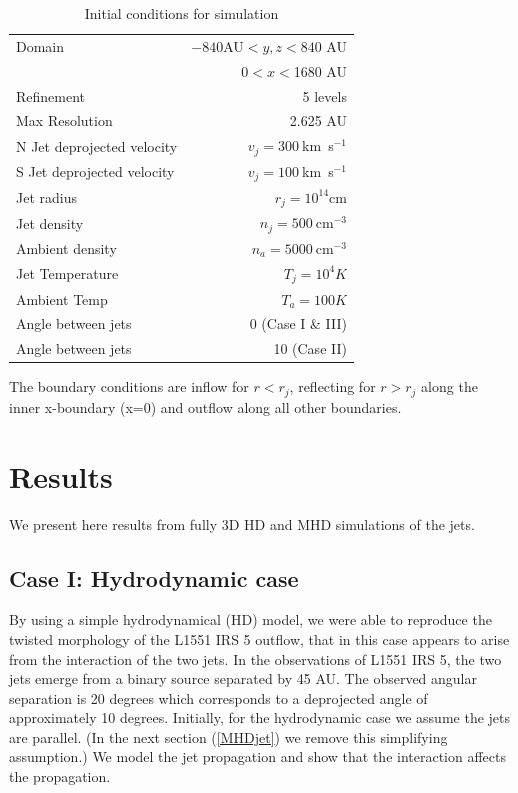 \documentclass{aa}
\begin{document}
\begin{table}
\begin{center}
\begin{tabular}{l r}
\hline
\hline
Domain & $-840 $AU$<y,z<840$ AU \\
 & 0$<x<$1680 AU \\
Refinement & 5 levels \\
{ Max Resolution} & { 2.625 AU} \\
N Jet deprojected velocity & $v_j=300~$km~s$^{-1}$ \\
S Jet deprojected velocity & $v_j=100~$km~s$^{-1}$ \\
{ Jet radius} & $r_j=10^{14}$cm \\
Jet density & $n_j=500~$cm$^{-3}$ \\
Ambient density & $n_a=5000~$cm$^{-3}$ \\
Jet Temperature & $T_j=10^4 K$ \\
Ambient Temp & $T_a=100 K$ \\
{ Angle between jets} & {0 (Case I \& III)} \\
{ Angle between jets} & {10 (Case II)} \\
\hline
\end{tabular}
\caption{Initial conditions for simulation}
\end{center}
\end{table}

The boundary conditions are inflow for $r<r_j$, reflecting for $r>r_j$ along the inner x-boundary (x=0) and outflow along all other boundaries. 
\section{Results}\label{Results}

We present here results from fully 3D HD and MHD simulations of the 
jets. 

\subsection{Case I: Hydrodynamic case }

By using a simple hydrodynamical (HD) model, we were able to reproduce 
the twisted morphology of the L1551 IRS 5 outflow, that in this case
appears to arise from the interaction of the two jets. 
In the observations of L1551 IRS 5, the two jets emerge from a binary source
separated by 45 AU. 
The observed angular separation is 20 degrees which corresponds to a deprojected
angle of approximately 10 degrees. 
Initially, for the hydrodynamic case we assume the jets are parallel.
(In the next section (\ref{MHDjet}) we remove this simplifying assumption.)
We model the jet propagation and show that the interaction affects the propagation.
\end{document}
